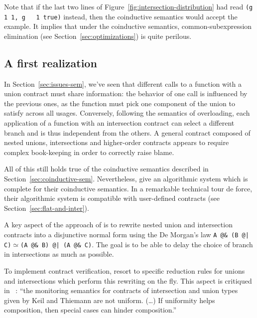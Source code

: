 \documentclass[sigplan,10pt]{acmart}
\newcommand{\nickel}[1]{\lstinline[language=nickel]{#1}}
\begin{document}
Note that if the last two lines of
Figure~\ref{fig:intersection-distribution} had read \nickel{(g 1 1, g
  1 true)} instead, then the coinductive semantics would accept the
example. It implies that under the coinductive semantics,
common-subexpression elimination (see Section~\ref{sec:optimizations})
is quite perilous.

\subsection{A first realization}
\label{sec:keil-thiemann}

In Section~\ref{sec:issues-sem}, we've seen that different calls to a function
with a union contract must share information: the behavior of one call is
influenced by the previous ones, as the function must pick one component of the
union to satisfy across all usages. Conversely, following the semantics of
overloading, each application of a function with an intersection contract can
select a different branch and is thus independent from the others. A general
contract composed of nested unions, intersections and higher-order contracts
appears to require complex book-keeping in order to correctly raise
blame.

All of this still holds true of the coinductive semantics described in
Section~\ref{sec:coinductive-sem}.  Nevertheless,
\citeauthor{KeilThiemannUnionIntersection} give an algorithmic system which is
complete for their coinductive semantics. In a remarkable technical tour de
force, their algorithmic system is compatible with user-defined contracts (see
Section~\ref{sec:flat-and-inter}).

A key aspect of the approach of \citeauthor{KeilThiemannUnionIntersection}
is to rewrite nested union and intersection contracts into a
disjunctive normal form using the De Morgan's law \nickel{A @& (B @|
  C)}$\simeq$\nickel{(A @& B) @| (A @& C)}. The goal is to be able to
delay the choice of branch in intersections as much as possible.

To implement contract verification, \citeauthor{KeilThiemannUnionIntersection}
resort to specific reduction rules for unions and intersections which perform
this rewriting on the fly. This aspect is critiqued in
\citeauthor{RootCauseOfBlame}~\cite{RootCauseOfBlame}: ``the monitoring semantics for
contracts of intersection and union types given by Keil and Thiemann are not
uniform. (\ldots) If uniformity helps composition, then special cases can hinder
composition.''
\end{document}
